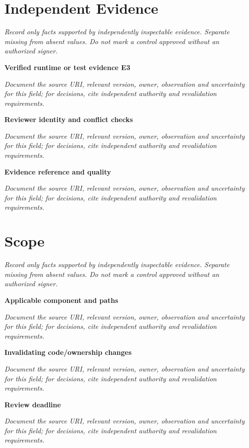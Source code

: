 \documentclass[11pt,letterpaper]{article}
\begin{document}
\section{Independent Evidence}
\noindent\emph{Record only facts supported by independently inspectable evidence. Separate missing from absent values. Do not mark a control approved without an authorized signer.}\par
\noindent\textbf{Verified runtime or test evidence E3}\par
\noindent\emph{Document the source URI, relevant version, owner, observation and uncertainty for this field; for decisions, cite independent authority and revalidation requirements.}\par\medskip
\noindent\textbf{Reviewer identity and conflict checks}\par
\noindent\emph{Document the source URI, relevant version, owner, observation and uncertainty for this field; for decisions, cite independent authority and revalidation requirements.}\par\medskip
\noindent\textbf{Evidence reference and quality}\par
\noindent\emph{Document the source URI, relevant version, owner, observation and uncertainty for this field; for decisions, cite independent authority and revalidation requirements.}\par\medskip
\section{Scope}
\noindent\emph{Record only facts supported by independently inspectable evidence. Separate missing from absent values. Do not mark a control approved without an authorized signer.}\par
\noindent\textbf{Applicable component and paths}\par
\noindent\emph{Document the source URI, relevant version, owner, observation and uncertainty for this field; for decisions, cite independent authority and revalidation requirements.}\par\medskip
\noindent\textbf{Invalidating code/ownership changes}\par
\noindent\emph{Document the source URI, relevant version, owner, observation and uncertainty for this field; for decisions, cite independent authority and revalidation requirements.}\par\medskip
\noindent\textbf{Review deadline}\par
\noindent\emph{Document the source URI, relevant version, owner, observation and uncertainty for this field; for decisions, cite independent authority and revalidation requirements.}\par\medskip
\end{document}
